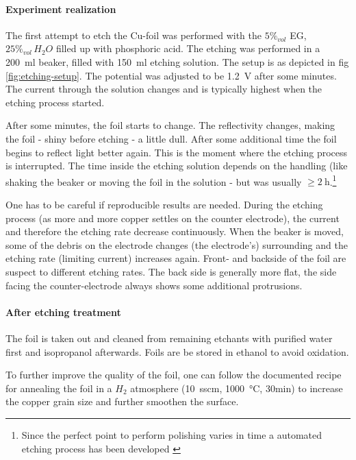 \paragraph{Experiment realization}The first attempt to etch the Cu-foil was performed with the $5\%_{vol}$ EG, $25\%_{vol}\,H_2O$ filled up with phosphoric acid. The etching was performed in a \SI{200}{\ml} beaker, filled with \SI{150}{\ml} etching solution. The setup is as depicted in fig \ref{fig:etching-setup}. The potential was adjusted to be \SI{1.2}{\V} after some minutes. The current through the solution changes and is typically highest when the etching process started. 

After some minutes, the foil starts to change. The reflectivity changes, making the foil - shiny before etching - a little dull. After some additional time the foil begins to reflect light better again. This is the moment where the etching process is interrupted. The time inside the etching solution depends on the handling (like shaking the beaker or moving the foil in the solution - but was usually $\geq \SI{2}{\hour}$.\footnote{Since the perfect point to perform polishing varies in time a automated etching process has been developed \cite{palmieri_besides_2001}}

One has to be careful if reproducible results are needed. During the etching process (as more and more copper settles on the counter electrode), the current and therefore the etching rate decrease continuously. When the beaker is moved, some of the debris on the electrode changes (the electrode's) surrounding and the etching rate (limiting current) increases again. Front- and backside of the foil are suspect to different etching rates. The back side is generally more flat, the side facing the counter-electrode always shows some additional protrusions.

\paragraph{After etching treatment}
The foil is taken out and cleaned from remaining etchants with purified water first and isopropanol afterwards. Foils are be stored in ethanol to avoid oxidation. 

To further improve the quality of the foil, one can follow the documented recipe for annealing the foil in a $H_2$ atmosphere (\SI{10}{sscm}, \SI{1000}{\celsius}, 30min)\cite{kim_synthesis_2012} to increase the copper grain size and further smoothen the surface. 

